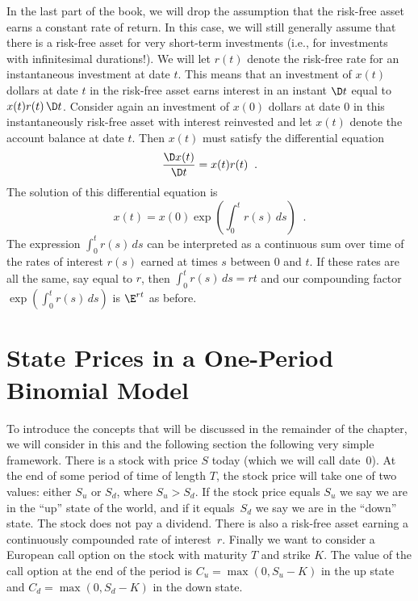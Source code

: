 In the last part of the book, we will drop the assumption that the risk-free asset earns a constant rate of return.  In this case, we will still generally assume that there is a risk-free asset for very short-term investments (i.e., for investments with infinitesimal durations!).  We will let $r(t)$ denote the risk-free rate for an instantaneous investment at date $t$. This means that an investment of $x(t)$ dollars at date $t$ in the risk-free asset earns interest in an instant $\D t$ equal to $x(t)r(t)\,\D t$.  Consider again an investment of $x(0)$ dollars at date 0 in this instantaneously risk-free asset with interest reinvested and let $x(t)$ denote the account balance at date $t$.  Then $x(t)$ must satisfy the differential equation
$$\frac{\D x(t)}{\D t} = x(t)r(t)\;\;.$$
The solution of this differential equation is
$$x(t) = x(0)\exp\left(\int_0^t r(s)\,ds\right)\;\;.$$
The expression $\int_0^t r(s)\,ds$ can be interpreted as a continuous sum over time of the rates of interest $r(s)$ earned at times $s$ between 0 and $t$.  If these rates are all the same, say equal to $r$, then $\int_0^t r(s)\,ds = rt$ and our compounding factor $\exp\left(\int_0^t r(s)\,ds\right)$ is $\E^{rt}$ as before.  

\section{State Prices in a One-Period Binomial Model}\label{s_oneperiodbinomial}

To introduce the concepts that will be discussed in the remainder of the chapter, we will consider in this and the following section the following very simple framework.   There is a stock with price $S$ today (which we will call date~0).  At the end of some period of time of length $T$, the stock price will take one of two values: either $S_u$ or $S_d$, where $S_u > S_d$.  If the stock price equals $S_u$ we say we are in the ``up'' state of the world, and if it equals~$S_d$ we say we are in the ``down'' state.  The stock does not pay a dividend.  There is also a risk-free asset earning a continuously compounded rate of interest~$r$.  Finally we want to consider a European call option on the stock with maturity $T$ and strike $K$.   The value of the call option at the end of the period is $C_u=\max(0,S_u-K)$ in the up state and $C_d=\max(0,S_d-K)$ in the down state. 

